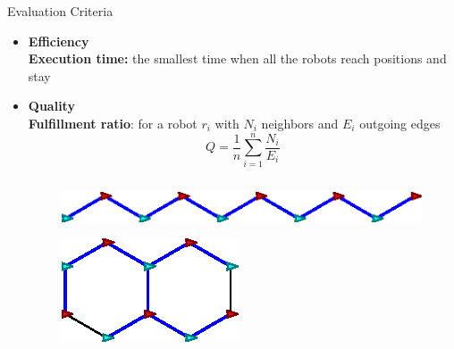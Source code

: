 \begin{frame}{Evaluation Criteria}
  \small{\begin{itemize}
  \item \textbf{Efficiency}\\
    \textbf{Execution time:} the smallest time when all the robots reach positions and stay
  \item \textbf{Quality} \\ 
    \textbf{Fulfillment ratio}: for a robot $r_i$ with
    $N_i$ neighbors and $E_i$ outgoing edges
    $$Q = \dfrac{1}{n}\sum\limits_{i=1}^n \frac{N_i}{E_i}$$
  \end{itemize}
  }
  \begin{columns}[T] 
    \begin{column}{.35\textwidth}
        
    \end{column}%
    \begin{column}{.55\textwidth}
      \begin{figure}
        \centering
        \includegraphics[width=0.75\linewidth]{figs/bad-hexagon}
      \end{figure}
      \begin{figure}
        \centering
        \includegraphics[scale=0.75]{figs/good-hexagon}
      \end{figure}
    \end{column}%
  \end{columns}
\end{frame}